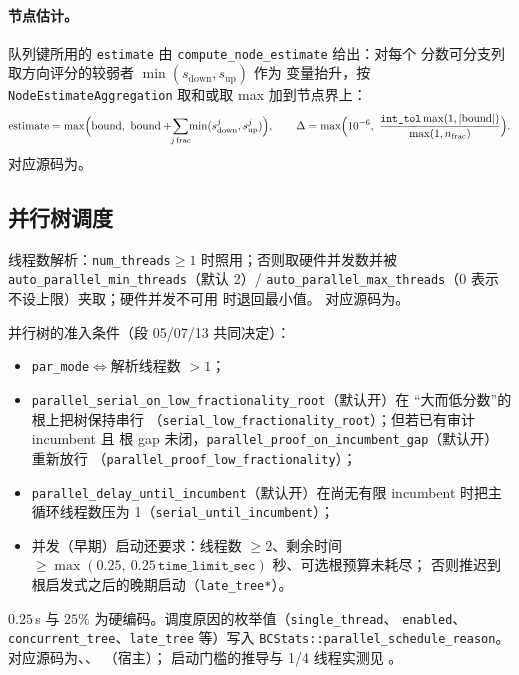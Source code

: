 \paragraph{节点估计。}
队列键所用的 \texttt{estimate} 由 \texttt{compute\_node\_estimate} 给出：对每个
分数可分支列取方向评分的较弱者 $\min(s_{\mathrm{down}},s_{\mathrm{up}})$ 作为
变量抬升，按 \texttt{NodeEstimateAggregation} 取和或取 max 加到节点界上：
\begin{equation}
  \mathrm{estimate}=\max\Bigl(\mathrm{bound},\ \mathrm{bound}
  +\!\!\sum_{j\,\mathrm{frac}}\!\!\min(s_{\mathrm{down}}^j,s_{\mathrm{up}}^j)\Bigr),
  \qquad
  \Delta=\max\Bigl(10^{-6},\ \frac{\texttt{int\_tol}\max(1,|\mathrm{bound}|)}
  {\max(1,n_{\mathrm{frac}})}\Bigr).
\end{equation}
对应源码为。

\subsection{并行树调度}\label{subsec:milpbc-parallel}

线程数解析：\texttt{num\_threads}$\ge 1$ 时照用；否则取硬件并发数并被
\texttt{auto\_parallel\_min\_threads}（默认 2）/%
\texttt{auto\_parallel\_max\_threads}（$0$ 表示不设上限）夹取；硬件并发不可用
时退回最小值。
对应源码为。

并行树的准入条件（段 05/07/13 共同决定）：
\begin{itemize}
  \item \texttt{par\_mode}$\iff$解析线程数 $>1$；
  \item \texttt{parallel\_serial\_on\_low\_fractionality\_root}（默认开）在
        ``大而低分数''的根上把树保持串行
        （\texttt{serial\_low\_fractionality\_root}）；但若已有审计 incumbent 且
        根 gap 未闭，\texttt{parallel\_proof\_on\_incumbent\_gap}（默认开）重新放行
        （\texttt{parallel\_proof\_low\_fractionality}）；
  \item \texttt{parallel\_delay\_until\_incumbent}（默认开）在尚无有限 incumbent
        时把主循环线程数压为 1（\texttt{serial\_until\_incumbent}）；
  \item 并发（早期）启动还要求：线程数 $\ge2$、剩余时间
        $\ge\max(0.25,\ 0.25\,\texttt{time\_limit\_sec})$ 秒、可选根预算未耗尽；
        否则推迟到根启发式之后的晚期启动（\texttt{late\_tree*}）。
\end{itemize}
$0.25$\,s 与 $25\%$ 为硬编码。调度原因的枚举值（\texttt{single\_thread}、
\texttt{enabled}、\texttt{concurrent\_tree}、\texttt{late\_tree} 等）写入
\texttt{BCStats::parallel\_schedule\_reason}。
对应源码为、、
（宿主）；
启动门槛的推导与 1/4 线程实测见
。

